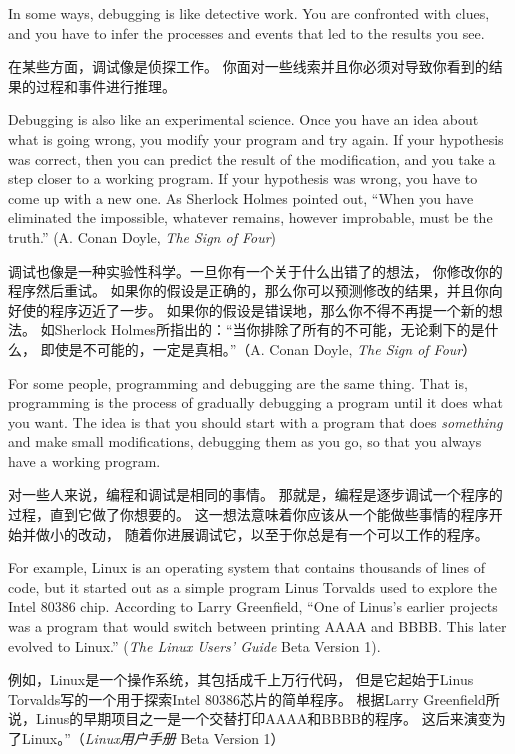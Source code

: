 \documentclass[10pt]{book}
\begin{document}
\begin{CJK}{UTF8}{gbsn}
In some ways, debugging is like detective work.  You are confronted
with clues, and you have to infer the processes and events that led
to the results you see.

在某些方面，调试像是侦探工作。
你面对一些线索并且你必须对导致你看到的结果的过程和事件进行推理。

Debugging is also like an experimental science.  Once you have an idea
about what is going wrong, you modify your program and try again.  If
your hypothesis was correct, then you can predict the result of the
modification, and you take a step closer to a working program.  If
your hypothesis was wrong, you have to come up with a new one.  As
Sherlock Holmes pointed out, ``When you have eliminated the
impossible, whatever remains, however improbable, must be the truth.''
(A. Conan Doyle, {\em The Sign of Four})

调试也像是一种实验性科学。一旦你有一个关于什么出错了的想法，
你修改你的程序然后重试。
如果你的假设是正确的，那么你可以预测修改的结果，并且你向好使的程序迈近了一步。
如果你的假设是错误地，那么你不得不再提一个新的想法。
如Sherlock Holmes所指出的：``当你排除了所有的不可能，无论剩下的是什么，
即使是不可能的，一定是真相。''（A. Conan Doyle, {\em The Sign of Four}）

For some people, programming and debugging are the same thing.  That
is, programming is the process of gradually debugging a program until
it does what you want.  The idea is that you should start with a
program that does {\em something} and make small modifications,
debugging them as you go, so that you always have a working program.

对一些人来说，编程和调试是相同的事情。
那就是，编程是逐步调试一个程序的过程，直到它做了你想要的。
这一想法意味着你应该从一个能做些事情的程序开始并做小的改动，
随着你进展调试它，以至于你总是有一个可以工作的程序。

For example, Linux is an operating system that contains thousands of
lines of code, but it started out as a simple program Linus Torvalds
used to explore the Intel 80386 chip.  According to Larry Greenfield,
``One of Linus's earlier projects was a program that would switch
between printing AAAA and BBBB.  This later evolved to Linux.''
({\em The Linux Users' Guide} Beta Version 1).

例如，Linux是一个操作系统，其包括成千上万行代码，
但是它起始于Linus Torvalds写的一个用于探索Intel 80386芯片的简单程序。
根据Larry Greenfield所说，Linus的早期项目之一是一个交替打印AAAA和BBBB的程序。
这后来演变为了Linux。''（{\em Linux用户手册} Beta Version 1）


\end{CJK}
\end{document}
